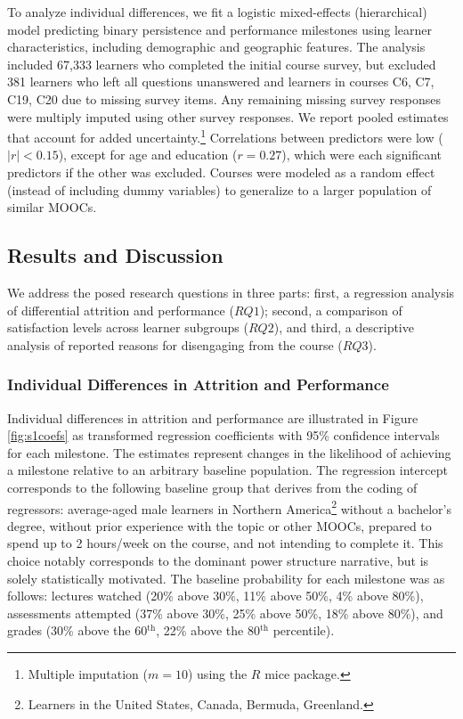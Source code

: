 \documentclass{sigchi}\usepackage[]{graphicx}\usepackage[]{color}
\begin{document}
To analyze individual differences, we fit a logistic mixed-effects (hierarchical) model predicting binary persistence and performance milestones using learner characteristics, including demographic and geographic features. The analysis included 67,333 learners who completed the initial course survey, but excluded 381 learners who left all questions unanswered and learners in courses C6, C7, C19, C20 due to missing survey items. Any remaining missing survey responses were multiply imputed using other survey responses. We report pooled estimates that account for added uncertainty.\footnote{Multiple imputation ($m=10$) using the $R$ mice package.} Correlations between predictors were low ($|r|<0.15$), except for age and education ($r=0.27$), which were each significant predictors if the other was excluded. Courses were modeled as a random effect (instead of including dummy variables) to generalize to a larger population of similar MOOCs.




\subsection{Results and Discussion}

We address the posed research questions in three parts: first, a regression analysis of differential attrition and performance ($RQ1$); second, a comparison of satisfaction levels across learner subgroups ($RQ2$), and third, a descriptive analysis of reported reasons for disengaging from the course ($RQ3$).

\subsubsection{Individual Differences in Attrition and Performance}

Individual differences in attrition and performance are illustrated in Figure \ref{fig:s1coefs} as transformed regression coefficients with 95\% confidence intervals for each milestone. The estimates represent changes in the likelihood of achieving a milestone relative to an arbitrary baseline population. The regression intercept corresponds to the following baseline group that derives from the coding of regressors: average-aged male learners in Northern America\footnote{Learners in the United States, Canada, Bermuda, Greenland.} without a bachelor's degree, without prior experience with the topic or other MOOCs, prepared to spend up to 2 hours/week on the course, and not intending to complete it. This choice notably corresponds to the dominant power structure narrative, but is solely statistically motivated. The baseline probability for each milestone was as follows: lectures watched (20\% above 30\%, 11\% above 50\%, 4\% above 80\%), assessments attempted (37\% above 30\%, 25\% above 50\%, 18\% above 80\%), and grades (30\% above the 60$^\text{th}$, 22\% above the 80$^\text{th}$ percentile).
\end{document}
